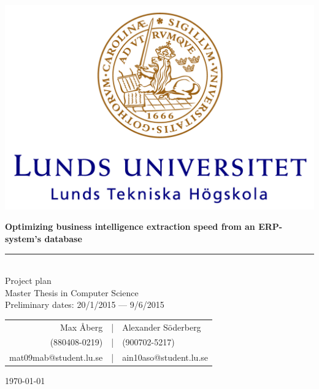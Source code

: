 \documentclass[12pt,a4paper]{article}
\newcommand{\HRule}{\rule{\linewidth}{0.5mm}}
\begin{document}
	\begin{titlepage}
  	\vspace*{3\baselineskip}
    \begin{center}
    	\begin{center}
    \includegraphics[scale=0.5]{Faculty_of_Engineering_(LTH),_Lund_University_logo.png}
    	\end{center}
    \vspace*{3\baselineskip}
    \large
    \bfseries
   \Huge
   Optimizing business intelligence extraction speed from an ERP-system's database
   \HRule\\
       \normalfont
          \LARGE
          Project plan \\
            \normalsize
            \vspace*{1\baselineskip}
      Master Thesis in  Computer Science\\
      \vspace*{4\baselineskip}
      Preliminary dates: 20/1/2015 --- 9/6/2015\\
      \vspace*{4\baselineskip}
      
      
      \begin{table}[H]
      \centering
      \begin{tabular}{r c l}
      Max Åberg &|& Alexander Söderberg\\
      (880408-0219) &|& (900702-5217) \\
      mat09mab@student.lu.se &|& ain10aso@student.lu.se\\
      \end{tabular}
      \end{table}

    
    

    \today \\

    \end{center}
\end{titlepage}
    
\end{document}
